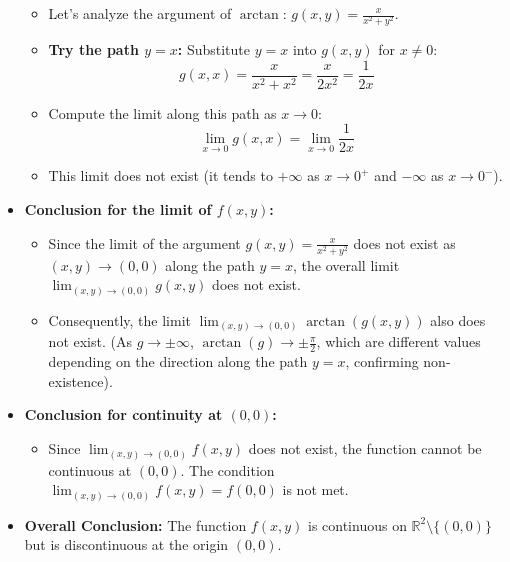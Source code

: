 \begin{cascade}
\begin{itemize}
\begin{itemize}
			      \item Let's analyze the argument of $\arctan$: $g(x, y) = \frac{x}{x^2 + y^2}$.
			      \item \textbf{Try the path $y=x$:} Substitute $y=x$ into $g(x,y)$ for $x \neq 0$:
			            \[ g(x, x) = \frac{x}{x^2 + x^2} = \frac{x}{2x^2} = \frac{1}{2x} \]
			      \item Compute the limit along this path as $x \to 0$:
			            \[ \lim_{x \to 0} g(x, x) = \lim_{x \to 0} \frac{1}{2x} \]
			      \item This limit does not exist (it tends to $+\infty$ as $x \to 0^+$ and $-\infty$ as $x \to 0^-$).
		      \end{itemize}
		\item \textbf{Conclusion for the limit of $f(x,y)$:}
		      \begin{itemize}
			      \item Since the limit of the argument $g(x,y) = \frac{x}{x^2+y^2}$ does not exist as $(x,y) \to (0,0)$ along the path $y=x$, the overall limit $\lim_{(x,y) \to (0,0)} g(x, y)$ does not exist.
			      \item Consequently, the limit $\lim_{(x,y) \to (0,0)} \arctan\left(g(x, y)\right)$ also does not exist.
			            (As $g \to \pm\infty$, $\arctan(g) \to \pm\frac{\pi}{2}$, which are different values depending on the direction along the path $y=x$, confirming non-existence).
		      \end{itemize}
		\item \textbf{Conclusion for continuity at $(0, 0)$:}
		      \begin{itemize}
			      \item Since $\lim_{(x,y) \to (0,0)} f(x, y)$ does not exist, the function cannot be continuous at $(0, 0)$. The condition $\lim_{(x,y) \to (0,0)} f(x, y) = f(0, 0)$ is not met.
		      \end{itemize}
		\item \textbf{Overall Conclusion:} The function $f(x, y)$ is continuous on $\mathbb{R}^2 \setminus \{(0, 0)\}$ but is discontinuous at the origin $(0, 0)$.
	\end{itemize}
\end{cascade}

\hfill

